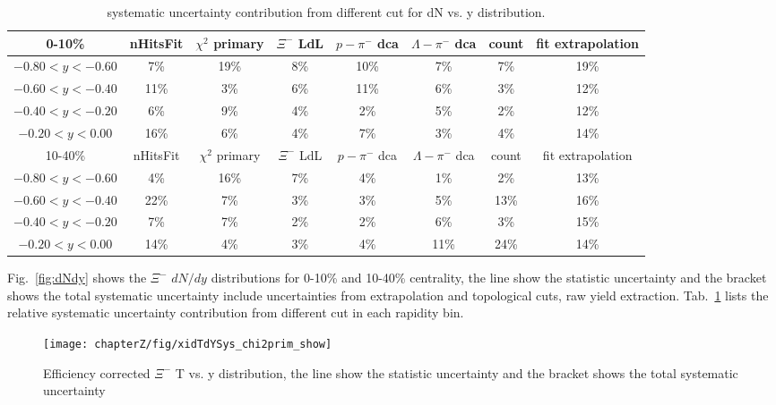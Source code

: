 \begin{table}[]
    \centering
    \begin{tabular}{|c|c|c|c|c|c|c|c|}
    \hline
        0-10\% & nHitsFit & $\chi^{2}$ primary & $\Xi^{-}$ LdL & $p-\pi^{-}$ dca & $\Lambda-\pi^{-}$ dca & count & fit extrapolation \\ \hline
        $-0.80<y<-0.60$ & 7\% & 19\% & 8\% & 10\% & 7\% & 7\% & 19\%   \\
        $-0.60<y<-0.40$ & 11\% & 3\% & 6\% & 11\% & 6\% & 3\% & 12\%   \\
        $-0.40<y<-0.20$ & 6\% & 9\% & 4\% & 2\% & 5\% & 2\% & 12\%   \\
        $-0.20<y<0.00$  & 16\% & 6\% & 4\% & 7\% & 3\% & 4\% & 14\%   \\
        \hline
        10-40\% & nHitsFit & $\chi^{2}$ primary & $\Xi^{-}$ LdL & $p-\pi^{-}$ dca & $\Lambda-\pi^{-}$ dca & count & fit extrapolation \\ \hline
        $-0.80<y<-0.60$ & 4\% & 16\% & 7\% & 4\% & 1\% & 2\% & 13\%  \\
        $-0.60<y<-0.40$ & 22\% & 7\% & 3\% & 3\% & 5\% & 13\% & 16\%   \\
        $-0.40<y<-0.20$ & 7\% & 7\% & 2\% & 2\% & 6\% & 3\% & 15\%   \\
        $-0.20<y<0.00$ & 14\% & 4\% & 3\% & 4\% & 11\% & 24\% & 14\%   \\
        \hline
    \end{tabular}
    \caption{systematic uncertainty contribution from different cut for dN vs. y distribution.}
    \label{tab:syserr_dNdy}
\end{table}
Fig.~\ref{fig:dNdy} shows the $\Xi^{-}$ $dN/dy$ distributions for 0-10\% and 10-40\% centrality, the line show the statistic uncertainty and the bracket shows the total systematic uncertainty include uncertainties from extrapolation and topological cuts, raw yield extraction. Tab.~\ref{tab:syserr_dNdy} lists the relative systematic uncertainty contribution from different cut in each rapidity bin.

\begin{figure*}[hbt!]
\texttt{[image: chapterZ/fig/xidTdYSys\_chi2prim\_show]}
\caption{Efficiency corrected $\Xi^{-}$ T vs. y distribution, the line show the statistic uncertainty and the bracket shows the total systematic uncertainty}
\label{fig:dTdy}
\end{figure*}

